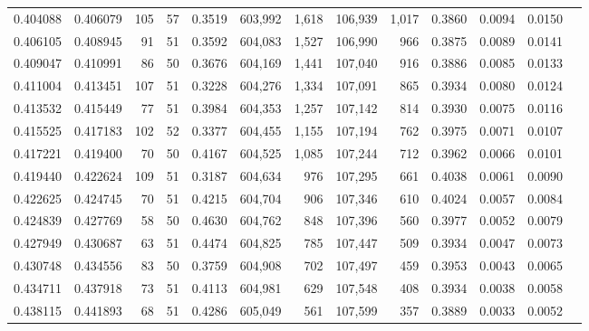\begin{tabular}{rrrrrrrrrrrrr}
0.404088 & 0.406079 &   105 &  57 &                                     0.3519 & 603,992 &   1,618 & 106,939 &   1,017 & 0.3860 & 0.0094 & 0.0150 \\
0.406105 & 0.408945 &    91 &  51 &                                     0.3592 & 604,083 &   1,527 & 106,990 &     966 & 0.3875 & 0.0089 & 0.0141 \\
0.409047 & 0.410991 &    86 &  50 &                                     0.3676 & 604,169 &   1,441 & 107,040 &     916 & 0.3886 & 0.0085 & 0.0133 \\
0.411004 & 0.413451 &   107 &  51 &                                     0.3228 & 604,276 &   1,334 & 107,091 &     865 & 0.3934 & 0.0080 & 0.0124 \\
0.413532 & 0.415449 &    77 &  51 &                                     0.3984 & 604,353 &   1,257 & 107,142 &     814 & 0.3930 & 0.0075 & 0.0116 \\
0.415525 & 0.417183 &   102 &  52 &                                     0.3377 & 604,455 &   1,155 & 107,194 &     762 & 0.3975 & 0.0071 & 0.0107 \\
0.417221 & 0.419400 &    70 &  50 &                                     0.4167 & 604,525 &   1,085 & 107,244 &     712 & 0.3962 & 0.0066 & 0.0101 \\
0.419440 & 0.422624 &   109 &  51 &                                     0.3187 & 604,634 &     976 & 107,295 &     661 & 0.4038 & 0.0061 & 0.0090 \\
0.422625 & 0.424745 &    70 &  51 &                                     0.4215 & 604,704 &     906 & 107,346 &     610 & 0.4024 & 0.0057 & 0.0084 \\
0.424839 & 0.427769 &    58 &  50 &                                     0.4630 & 604,762 &     848 & 107,396 &     560 & 0.3977 & 0.0052 & 0.0079 \\
0.427949 & 0.430687 &    63 &  51 &                                     0.4474 & 604,825 &     785 & 107,447 &     509 & 0.3934 & 0.0047 & 0.0073 \\
0.430748 & 0.434556 &    83 &  50 &                                     0.3759 & 604,908 &     702 & 107,497 &     459 & 0.3953 & 0.0043 & 0.0065 \\
0.434711 & 0.437918 &    73 &  51 &                                     0.4113 & 604,981 &     629 & 107,548 &     408 & 0.3934 & 0.0038 & 0.0058 \\
0.438115 & 0.441893 &    68 &  51 &                                     0.4286 & 605,049 &     561 & 107,599 &     357 & 0.3889 & 0.0033 & 0.0052 \\

\end{tabular}
